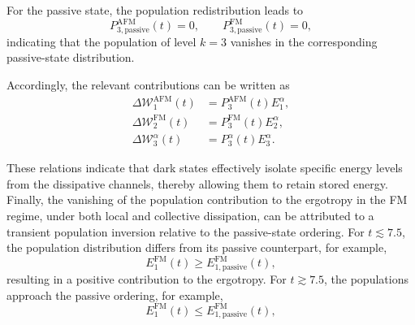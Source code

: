 \documentclass[aps,superscriptaddress,twocolumn,pre,longbibliography,floatfix]{revtex4-1}
\begin{document}
	For the passive state, the population redistribution leads to
	\begin{equation}
		P_{3,\mathrm{passive}}^{\mathrm{AFM}}(t)=0,
		\qquad
		P_{3,\mathrm{passive}}^{\mathrm{FM}}(t)=0,
	\end{equation}
	indicating that the population of level $k=3$ vanishes in the corresponding passive-state distribution.
	
	Accordingly, the relevant contributions can be written as
	\begin{align}
		\Delta\mathcal{W}_1^{\mathrm{AFM}}(t)
		&=
		P_3^{\mathrm{AFM}}(t)E_1^{\alpha},
		\\
		\Delta\mathcal{W}_2^{\mathrm{FM}}(t)
		&=
		P_3^{\mathrm{FM}}(t)E_2^{\alpha},
		\\
		\Delta\mathcal{W}_3^{\alpha}(t)
		&=
		P_3^{\alpha}(t)E_3^{\alpha}.
	\end{align}
	
	These relations indicate that dark states effectively isolate specific energy levels from the dissipative channels, thereby allowing them to retain stored energy. Finally, the vanishing of the population contribution to the ergotropy in the FM regime, under both local and collective dissipation, can be attributed to a transient population inversion relative to the passive-state ordering. For $t\lesssim 7.5$, the population distribution differs from its passive counterpart, for example,
	\begin{equation}
		E_1^{\mathrm{FM}}(t)
		\geq
		E_{1,\mathrm{passive}}^{\mathrm{FM}}(t),
	\end{equation}
	resulting in a positive contribution to the ergotropy. For $t\gtrsim 7.5$, the populations approach the passive ordering, for example,
	\begin{equation}
		E_1^{\mathrm{FM}}(t)
		\leq
		E_{1,\mathrm{passive}}^{\mathrm{FM}}(t),
	\end{equation}
    
	
\end{document}
